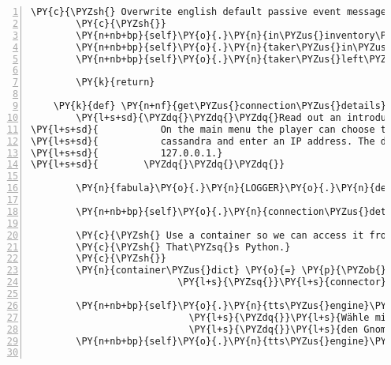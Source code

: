 \begin{Verbatim}[commandchars=\\\{\},numbers=left,firstnumber=1,stepnumber=1]
        \PY{c}{\PYZsh{} Overwrite english default passive event messages}
        \PY{c}{\PYZsh{}}
        \PY{n+nb+bp}{self}\PY{o}{.}\PY{n}{in\PYZus{}inventory\PYZus{}msg} \PY{o}{=} \PY{l+s}{\PYZdq{}}\PY{l+s}{\PYZob{}\PYZcb{} ins Inventar aufgenommen}\PY{l+s}{\PYZdq{}}
        \PY{n+nb+bp}{self}\PY{o}{.}\PY{n}{taker\PYZus{}in\PYZus{}room\PYZus{}msg} \PY{o}{=} \PY{l+s}{\PYZdq{}}\PY{l+s}{\PYZob{}\PYZcb{} ist im Raum}\PY{l+s}{\PYZdq{}}
        \PY{n+nb+bp}{self}\PY{o}{.}\PY{n}{taker\PYZus{}left\PYZus{}room\PYZus{}msg} \PY{o}{=} \PY{l+s}{\PYZdq{}}\PY{l+s}{\PYZob{}\PYZcb{} hat den Raum verlassen}\PY{l+s}{\PYZdq{}}

        \PY{k}{return}

    \PY{k}{def} \PY{n+nf}{get\PYZus{}connection\PYZus{}details}\PY{p}{(}\PY{n+nb+bp}{self}\PY{p}{,} \PY{n}{prompt\PYZus{}connector}\PY{o}{=}\PY{n+nb+bp}{True}\PY{p}{)}\PY{p}{:}
        \PY{l+s+sd}{\PYZdq{}\PYZdq{}\PYZdq{}Read out an introductory text and make an AudioMenuList as main Menu.}
\PY{l+s+sd}{           On the main menu the player can choose to start game as kuni or}
\PY{l+s+sd}{           cassandra and enter an IP address. The default IP address is}
\PY{l+s+sd}{           127.0.0.1.}
\PY{l+s+sd}{        \PYZdq{}\PYZdq{}\PYZdq{}}

        \PY{n}{fabula}\PY{o}{.}\PY{n}{LOGGER}\PY{o}{.}\PY{n}{debug}\PY{p}{(}\PY{l+s}{\PYZdq{}}\PY{l+s}{called}\PY{l+s}{\PYZdq{}}\PY{p}{)}

        \PY{n+nb+bp}{self}\PY{o}{.}\PY{n}{connection\PYZus{}details\PYZus{}complete} \PY{o}{=} \PY{n+nb+bp}{False}

        \PY{c}{\PYZsh{} Use a container so we can access it from an ad\PYZhy{}hoc function.}
        \PY{c}{\PYZsh{} That\PYZsq{}s Python.}
        \PY{c}{\PYZsh{}}
        \PY{n}{container\PYZus{}dict} \PY{o}{=} \PY{p}{\PYZob{}}\PY{l+s}{\PYZsq{}}\PY{l+s}{login\PYZus{}name}\PY{l+s}{\PYZsq{}} \PY{p}{:} \PY{l+s}{\PYZsq{}}\PY{l+s}{player}\PY{l+s}{\PYZsq{}}\PY{p}{,}
                          \PY{l+s}{\PYZsq{}}\PY{l+s}{connector}\PY{l+s}{\PYZsq{}} \PY{p}{:} \PY{l+s}{\PYZsq{}}\PY{l+s}{127.0.0.1}\PY{l+s}{\PYZsq{}}\PY{p}{\PYZcb{}}

        \PY{n+nb+bp}{self}\PY{o}{.}\PY{n}{tts\PYZus{}engine}\PY{o}{.}\PY{n}{say}\PY{p}{(}\PY{l+s}{\PYZdq{}}\PY{l+s}{Willkommen bei dem Abenteuerspiel Zauberwald! }\PY{l+s}{\PYZdq{}}
                            \PY{l+s}{\PYZdq{}}\PY{l+s}{Wähle mit den Pfeiltasten hoch und runter aus, ob du die Fee Cassandra oder }\PY{l+s}{\PYZdq{}}
                            \PY{l+s}{\PYZdq{}}\PY{l+s}{den Gnom Kuni spielen möchtest. Bestätige deine Auswahl mit der Pfeiltaste rechts.}\PY{l+s}{\PYZdq{}}\PY{p}{,} \PY{l+s}{\PYZsq{}}\PY{l+s}{intro}\PY{l+s}{\PYZsq{}}\PY{p}{)}
        \PY{n+nb+bp}{self}\PY{o}{.}\PY{n}{tts\PYZus{}engine}\PY{o}{.}\PY{n}{runAndWait}\PY{p}{(}\PY{p}{)}


\end{Verbatim}

